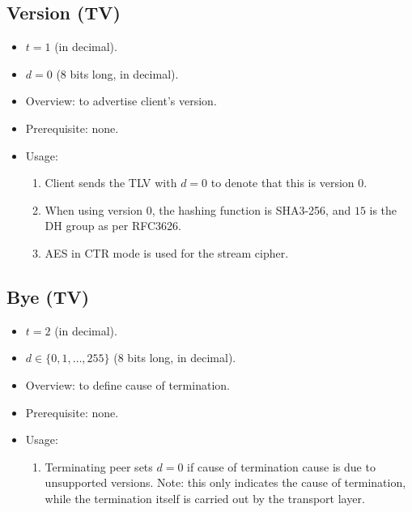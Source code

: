 \documentclass{article}
\begin{document}
\subsection{Version (TV)}
\begin{itemize}
    \item $t = 1$ (in decimal).
    \item $d = 0$ (8 bits long, in decimal).
    \item Overview: to advertise client's version. 
    \item Prerequisite: none.
    \item Usage:
        \begin{enumerate}
            \item Client sends the TLV with $d=0$ to denote that this is
            version 0.
            \item When using version $0$, the hashing function is SHA3-256, and
            $15$ is the DH group as per RFC3626.
            \item AES in CTR mode is used for the stream cipher.
        \end{enumerate}
\end{itemize}

\subsection{Bye (TV)}
\begin{itemize}
    \item $t = 2$ (in decimal).
    \item $d \in \{0,1,\ldots,255\}$ (8 bits long, in decimal).
    \item Overview: to define cause of termination. 
    \item Prerequisite: none.
    \item Usage:
        \begin{enumerate}
            \item Terminating peer sets $d=0$ if cause of termination cause is
            due to unsupported versions. Note: this only indicates the cause of
            termination, while the termination itself is carried out by the
            transport layer.
        \end{enumerate}
\end{itemize}
\end{document}
